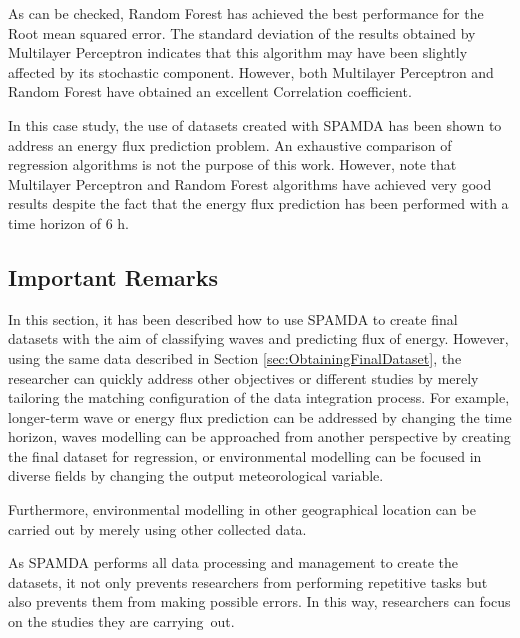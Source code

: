 \documentclass[energies,article,accept,moreauthors,pdftex]{Definitions/mdpi}
\begin{document}
\begin{paracol}{2}
\begin{specialtable}[H]
{\begin{tabularx}{\columnwidth}{>{\PreserveBackslash\centering}m{\cellWidtha}>{\PreserveBackslash\centering}m{\cellWidthb}>{\PreserveBackslash\centering}m{\cellWidthc}}
						\bottomrule
							
					\end{tabularx}}
				
				\end{specialtable}
			
			As can be checked, Random Forest has achieved the best performance for the Root mean squared error. The standard deviation of the results obtained by Multilayer Perceptron indicates that this algorithm may have been slightly affected by its stochastic component. However, both Multilayer Perceptron and Random Forest have obtained an excellent Correlation coefficient.
			
			In this case study, the use of datasets created with SPAMDA has been shown to address an energy flux prediction problem. An exhaustive comparison of regression algorithms is not the purpose of this work. However, note that Multilayer Perceptron and Random Forest algorithms have achieved very good results despite the fact that the energy flux prediction has been performed with a time horizon of 6 h.

		\subsection{Important Remarks}
		
			In this section, it has been described how to use SPAMDA to create final datasets with the aim of classifying waves and predicting flux of energy. However, using the same data described in Section \ref{sec:ObtainingFinalDataset}, the researcher can quickly address other objectives or different studies by merely tailoring the matching configuration of the data integration process. For example, longer-term wave or energy flux prediction can be addressed by changing the time horizon, waves modelling can be approached from another perspective by creating the final dataset for regression, or environmental modelling can be focused in diverse fields by changing the output meteorological variable.

			Furthermore, environmental modelling in other geographical location can be carried out by merely using other collected data.
			
			As SPAMDA performs all data processing and management to create the datasets, it not only prevents researchers from performing repetitive tasks but also prevents them from making possible errors. In this way, researchers can focus on the studies they are carrying~out.
		

\end{paracol}
\end{document}
